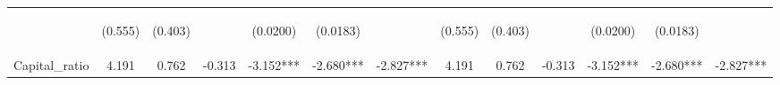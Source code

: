 \documentclass[]{article}
\begin{document}
\begin{center}
\begin{tabular}{lcccccccccccc}
\vspace{4pt} & \begin{footnotesize}(0.555)\end{footnotesize} & \begin{footnotesize}(0.403)\end{footnotesize} & \begin{footnotesize}\end{footnotesize} & \begin{footnotesize}(0.0200)\end{footnotesize} & \begin{footnotesize}(0.0183)\end{footnotesize} & \begin{footnotesize}\end{footnotesize} & \begin{footnotesize}(0.555)\end{footnotesize} & \begin{footnotesize}(0.403)\end{footnotesize} & \begin{footnotesize}\end{footnotesize} & \begin{footnotesize}(0.0200)\end{footnotesize} & \begin{footnotesize}(0.0183)\end{footnotesize} & \begin{footnotesize}\end{footnotesize} \\
Capital\_ratio & 4.191 & 0.762 & -0.313 & -3.152*** & -2.680*** & -2.827*** & 4.191 & 0.762 & -0.313 & -3.152*** & -2.680*** & -2.827*** \\

\end{tabular}
\end{center}
\end{document}
